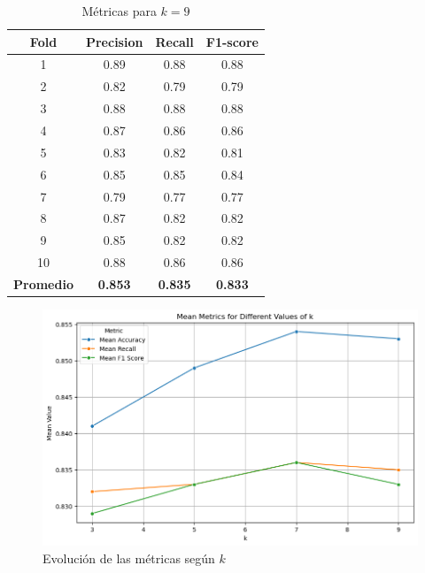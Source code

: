 \documentclass[conference]{IEEEtran}
\begin{document}
\begin{table}[ht]
    \centering
    \begin{tabular}{cccc}
        \textbf{Fold} & \textbf{Precision} & \textbf{Recall} & \textbf{F1-score} \\
        \hline
        1 & 0.89 & 0.88 & 0.88 \\
        2 & 0.82 & 0.79 & 0.79 \\
        3 & 0.88 & 0.88 & 0.88 \\
        4 & 0.87 & 0.86 & 0.86 \\
        5 & 0.83 & 0.82 & 0.81 \\
        6 & 0.85 & 0.85 & 0.84 \\
        7 & 0.79 & 0.77 & 0.77 \\
        8 & 0.87 & 0.82 & 0.82 \\
        9 & 0.85 & 0.82 & 0.82 \\
        10 & 0.88 & 0.86 & 0.86 \\
        \hline
        \textbf{Promedio} & \textbf{0.853} & \textbf{0.835} & \textbf{0.833} \\
    \end{tabular}
    \caption{Métricas para \( k = 9 \)} 
    \label{tab:knn9}
\end{table}

\begin{figure}[ht]
    \centering
    \includegraphics[width=1\linewidth]{kevolve.png}
    \caption{Evolución de las métricas según \(k\)}
    \label{fig:knnmat7}
\end{figure}
\end{document}
